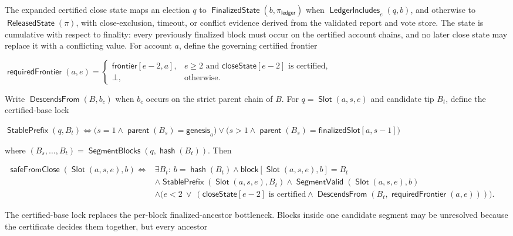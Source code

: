 \documentclass[sigplan,twocolumn,review,anonymous]{acmart}
\newcommand{\func}[1]{\operatorname{\mathsf{#1}}}
\newcommand{\hash}{\func{hash}}
\newcommand{\Slot}{\func{Slot}}
\newcommand{\SegmentBlocks}{\func{SegmentBlocks}}
\newcommand{\SegmentValid}{\func{SegmentValid}}
\newcommand{\blockMap}{\mathsf{block}}
\newcommand{\frontier}{\mathsf{frontier}}
\newcommand{\parent}{\func{parent}}
\newcommand{\finalizedSlot}{\mathsf{finalizedSlot}}
\newcommand{\closeState}{\mathsf{closeState}}
\newcommand{\requiredFrontier}{\func{requiredFrontier}}
\newcommand{\DescendsFrom}{\func{DescendsFrom}}
\newcommand{\safeFromClose}{\func{safeFromClose}}
\newcommand{\StablePrefix}{\func{StablePrefix}}
\newcommand{\FinalizedState}{\func{FinalizedState}}
\newcommand{\ReleasedState}{\func{ReleasedState}}
\begin{document}
The expanded certified close state maps an election \(q\) to
\(\FinalizedState(b,\pi_{\mathsf{ledger}})\) when \(\func{LedgerIncludes}_e(q,b)\), and otherwise to
\(\ReleasedState(\pi)\), with close-exclusion, timeout, or conflict evidence derived from the validated
report and vote store.  The state is cumulative with respect to finality: every previously finalized
block must occur on the certified account chains, and no later close state may replace it with a
conflicting value.  For account \(a\), define the governing certified frontier
\begin{center}
\begin{adjustbox}{max width=\columnwidth}
\(\displaystyle
\requiredFrontier(a,e)=
\begin{cases}
\frontier[e-2,a], & e\ge2\text{ and }\closeState[e-2]\text{ is certified},\\
\bot, & \text{otherwise.}
\end{cases}
\)
\end{adjustbox}
\end{center}
Write \(\DescendsFrom(B,b_c)\) when \(b_c\) occurs on the strict parent chain of \(B\).  For
\(q=\Slot(a,s,e)\) and candidate tip \(B_t\), define the certified-base lock
\begin{center}
\begin{adjustbox}{max width=\columnwidth}
\(\displaystyle
\StablePrefix(q,B_t)\iff
\bigl(s=1\wedge\parent(B_s)=\mathsf{genesis}_a\bigr)
\vee
\bigl(s>1\wedge\parent(B_s)=\finalizedSlot[a,s-1]\bigr)
\)
\end{adjustbox}
\end{center}
where \((B_s,\ldots,B_t)=\SegmentBlocks(q,\hash(B_t))\).  Then
\begin{center}
\begin{adjustbox}{max width=\columnwidth}
\(\displaystyle
\begin{aligned}
\safeFromClose(\Slot(a,s,e),b)\iff{}& \exists B_t:\ b=\hash(B_t)\wedge\blockMap[\Slot(a,s,e),b]=B_t\\
&\wedge\StablePrefix(\Slot(a,s,e),B_t)\wedge\SegmentValid(\Slot(a,s,e),b)\\
&\wedge\bigl(e<2\ \vee\ (\closeState[e-2]\text{ is certified}
\wedge\DescendsFrom(B_t,\requiredFrontier(a,e)))\bigr).
\end{aligned}
\)
\end{adjustbox}
\end{center}
The certified-base lock replaces the per-block finalized-ancestor bottleneck.  Blocks inside one
candidate segment may be unresolved because the certificate decides them together, but every ancestor
\end{document}
